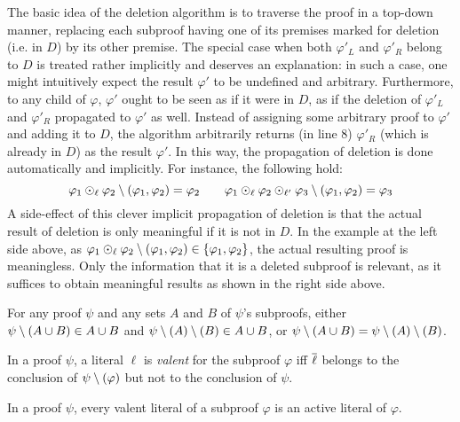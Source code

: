 \documentclass{llncs}
\begin{document}
The basic idea of the deletion algorithm is to traverse the proof in a top-down manner, replacing each subproof having one of its premises marked for deletion (i.e. in $D$) by its other premise. The special case when both $\varphi'_L$ and $\varphi'_R$ belong to $D$ is treated rather implicitly and deserves an explanation: in such a case, one might intuitively expect the result $\varphi'$ to be undefined and arbitrary. Furthermore, to any child of $\varphi$, $\varphi'$ ought to be seen as if it were in $D$, as if the deletion of $\varphi'_L$ and $\varphi'_R$ propagated to $\varphi'$ as well. Instead of assigning some arbitrary proof to $\varphi'$ and adding it to $D$, the algorithm arbitrarily returns (in line 8) $\varphi'_R$ (which is already in $D$) as the result $\varphi'$. In this way, the propagation of deletion is done automatically and implicitly. For instance, the following hold:
$$
\varphi_1 \odot_\ell \varphi_2 \setminus (\varphi_1, \varphi_2) = \varphi_2
\qquad
\varphi_1 \odot_\ell \varphi_2 \odot_{\ell'} \varphi_3 \setminus (\varphi_1, \varphi_2) = \varphi_3 
$$
A side-effect of this clever implicit propagation of deletion is that the actual result of deletion is only meaningful if it is not in $D$. In the example at the left side above, as $\varphi_1 \odot_\ell \varphi_2 \setminus (\varphi_1, \varphi_2) \in \{\varphi_1, \varphi_2\} $, the actual resulting proof is meaningless. Only the information that it is a deleted subproof is relevant, as it suffices to obtain meaningful results as shown in the right side above.

\begin{proposition} \label{prop:del_assoc}
For any proof $\psi$ and any sets $A$ and $B$ of $\psi$'s subproofs,
either $\psi \setminus (A \cup B)  \in A \cup B$
and    $\psi \setminus (A) \setminus (B) \in A \cup B$,
or     $\psi \setminus (A \cup B) = \psi \setminus (A) \setminus (B)$.
\end{proposition}


\begin{definition}
  In a proof $\psi$, a literal $\ell$ is \emph{valent} for the subproof $\varphi$ iff $\overline{\ell}$
  belongs to the conclusion of $\psi \setminus (\varphi)$ but not to the conclusion of $\psi$.
\end{definition}

\begin{proposition} \label{prop:valentactive}
In a proof $\psi$, every valent literal of a subproof $\varphi$ is an active literal of $\varphi$.
\end{proposition}
\end{document}
